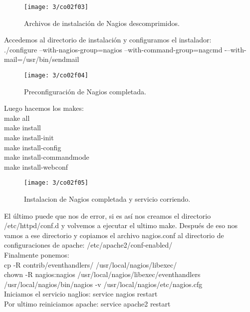 \begin{figure}[H]
	\centering
	\texttt{[image: 3/co02f03]}
	\caption{Archivos de instalación de Nagios descomprimidos.}
	\label{fig:f15}
\end{figure}

Accedemos al directorio de instalación y configuramos el instalador:\\

./configure --with-nagios-group=nagios --with-command-group=nagcmd -–with-mail=/usr/bin/sendmail\\

\begin{figure}[H]
	\centering
	\texttt{[image: 3/co02f04]}
	\caption{Preconfiguración de Nagios completada.}
	\label{fig:f16}
\end{figure}

Luego hacemos los makes:\\
make all\\
make install\\
make install-init\\
make install-config\\
make install-commandmode\\
make install-webconf\\

\begin{figure}[H]
	\centering
	\texttt{[image: 3/co02f05]}
	\caption{Instalacion de Nagios completada y servicio corriendo.}
	\label{fig:f17}
\end{figure}

El último puede que nos de error, si es así nos creamos el directorio /etc/httpd/conf.d y volvemos a ejecutar el ultimo make. Después de eso nos vamos a ese directorio y copiamos el archivo nagios.conf al directorio de configuraciones de apache: /etc/apache2/conf-enabled/ \\

Finalmente ponemos:\\
cp -R contrib/eventhandlers/ /usr/local/nagios/libexec/ \\
chown -R nagios:nagios /usr/local/nagios/libexec/eventhandlers \\
/usr/local/nagios/bin/nagios -v /usr/local/nagios/etc/nagios.cfg \\

Iniciamos el servicio naglios: service nagios restart \\

Por ultimo reiniciamos apache: service apache2 restart \\


